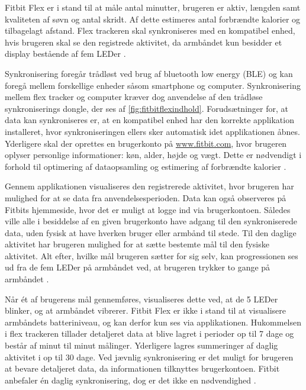 \noindent
Fitbit Flex er i stand til at måle antal minutter, brugeren er aktiv, længden samt kvaliteten af søvn og antal skridt. Af dette estimeres antal forbrændte kalorier og tilbagelagt afstand. 
Flex trackeren skal synkroniseres med en kompatibel enhed, hvis brugeren skal se den registrede aktivitet, da armbåndet kun besidder et display bestående af fem LEDer \citep{fitbitflex}. 

Synkronisering foregår trådløst ved brug af bluetooth low energy (BLE) og kan foregå mellem forskellige enheder såsom smartphone og computer. 
Synkronisering mellem flex tracker og computer kræver dog anvendelse af den trådløse synkroniserings dongle, der ses af \autoref{fig:fitbitflexindhold}.
Forudsætninger for, at data kan synkroniseres er, at en kompatibel enhed har den korrekte applikation installeret, hvor synkroniseringen ellers sker automatisk idet applikationen åbnes.  
Yderligere skal der oprettes en brugerkonto på \url{www.fitbit.com}, hvor brugeren oplyser personlige informationer: køn, alder, højde og vægt. Dette er nødvendigt i forhold til optimering af dataopsamling og estimering af forbrændte kalorier \citep{fitbitflex}.  

Gennem applikationen visualiseres den registrerede aktivitet, hvor brugeren har mulighed for at se data fra anvendelsesperioden. Data kan også observeres på Fitbits hjemmeside, hvor det er muligt at logge ind via brugerkontoen. 
Således ville alle i besiddelse af en given brugerkonto have adgang til den synkroniserede data, uden fysisk at have hverken bruger eller armbånd til stede. 
Til den daglige aktivitet har brugeren mulighed for at sætte bestemte mål til den fysiske aktivitet. Alt efter, hvilke mål brugeren sætter for sig selv, kan progressionen ses ud fra de fem LEDer på armbåndet ved, at brugeren trykker to gange på armbåndet \citep{fitbitflex}.   

Når ét af brugerens mål gennemføres, visualiseres dette ved, at de 5 LEDer blinker, og at armbåndet vibrerer. 
Fitbit Flex er ikke i stand til at visualisere armbåndets batteriniveau, og kan derfor kun ses via applikationen. 
Hukommelsen i flex trackeren tillader detaljeret data at blive lagret i perioder op til 7 dage og består af minut til minut målinger.  
Yderligere lagres summeringer af daglig aktivitet i op til 30 dage. 
Ved jævnlig synkronisering er det muligt for brugeren at bevare detaljeret data, da informationen tilknyttes brugerkontoen. 
Fitbit anbefaler én daglig synkronisering, dog er det ikke en nødvendighed \citep{fitbitflex}. 

